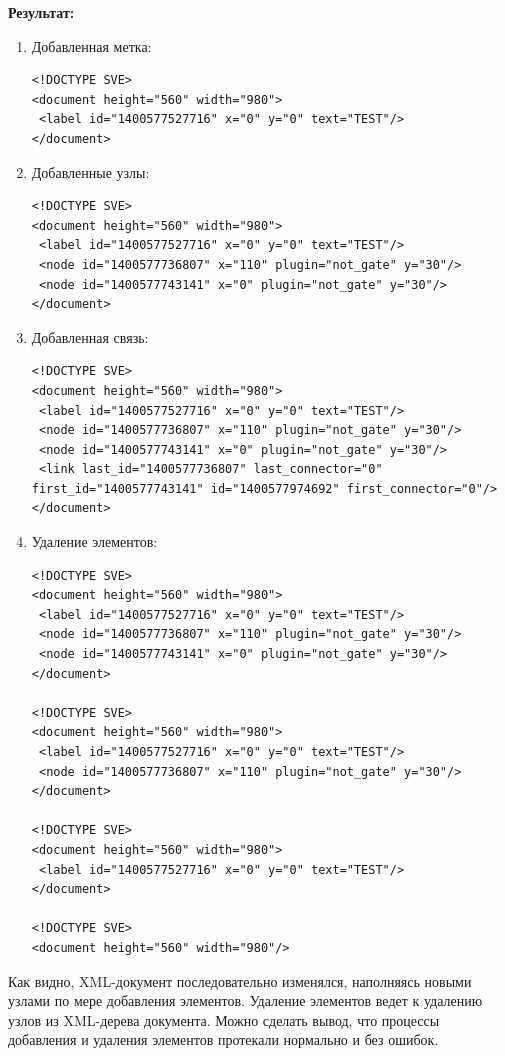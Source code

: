 \textbf{Результат:}
\begin{enumerate}
  \item Добавленная метка:
  \begin{lstlisting}[xleftmargin=0cm]
<!DOCTYPE SVE>
<document height="560" width="980">
 <label id="1400577527716" x="0" y="0" text="TEST"/>
</document>
  \end{lstlisting}
  \item Добавленные узлы:
  \begin{lstlisting}[xleftmargin=0cm]
<!DOCTYPE SVE>
<document height="560" width="980">
 <label id="1400577527716" x="0" y="0" text="TEST"/>
 <node id="1400577736807" x="110" plugin="not_gate" y="30"/>
 <node id="1400577743141" x="0" plugin="not_gate" y="30"/>
</document>
  \end{lstlisting}
  \item Добавленная связь:
  \begin{lstlisting}[xleftmargin=0cm]
<!DOCTYPE SVE>
<document height="560" width="980">
 <label id="1400577527716" x="0" y="0" text="TEST"/>
 <node id="1400577736807" x="110" plugin="not_gate" y="30"/>
 <node id="1400577743141" x="0" plugin="not_gate" y="30"/>
 <link last_id="1400577736807" last_connector="0" first_id="1400577743141" id="1400577974692" first_connector="0"/>
</document>
  \end{lstlisting}
  \item Удаление элементов:
  \begin{lstlisting}[xleftmargin=0cm]
<!DOCTYPE SVE>
<document height="560" width="980">
 <label id="1400577527716" x="0" y="0" text="TEST"/>
 <node id="1400577736807" x="110" plugin="not_gate" y="30"/>
 <node id="1400577743141" x="0" plugin="not_gate" y="30"/>
</document>

<!DOCTYPE SVE>
<document height="560" width="980">
 <label id="1400577527716" x="0" y="0" text="TEST"/>
 <node id="1400577736807" x="110" plugin="not_gate" y="30"/>
</document>

<!DOCTYPE SVE>
<document height="560" width="980">
 <label id="1400577527716" x="0" y="0" text="TEST"/>
</document>

<!DOCTYPE SVE>
<document height="560" width="980"/>
  \end{lstlisting}
\end{enumerate}

Как видно, XML-документ последовательно изменялся, наполняясь новыми узлами по мере добавления элементов.
Удаление элементов ведет к удалению узлов из XML-дерева документа.
Можно сделать вывод, что процессы добавления и удаления элементов протекали нормально и без ошибок.


